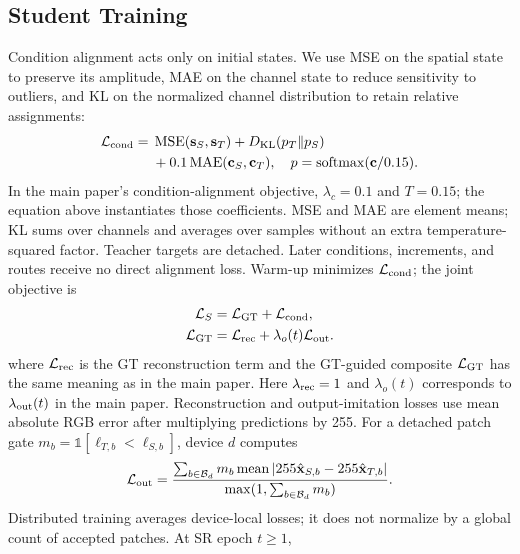 \documentclass[10pt,journal,letterpaper]{IEEEtran}
\begin{document}
\subsection{Student Training}
Condition alignment acts only on initial states. We use MSE on the spatial state to preserve its amplitude, MAE on the channel state to reduce sensitivity to outliers, and KL on the normalized channel distribution to retain relative assignments:
\begin{equation}
\begin{split}
\mathcal L_{\rm cond}={}&\operatorname{MSE}(\mathbf s_S,\mathbf s_T)
+D_{\rm KL}(p_T\Vert p_S)\\
&+0.1\operatorname{MAE}(\mathbf c_S,\mathbf c_T),\quad
p=\operatorname{softmax}(\mathbf c/0.15).
\end{split}
\label{eq:supp_student_cond}
\end{equation}
In the main paper's condition-alignment objective, $\lambda_c=0.1$ and $T=0.15$; the equation above instantiates those coefficients. MSE and MAE are element means; KL sums over channels and averages over samples without an extra temperature-squared factor. Teacher targets are detached. Later conditions, increments, and routes receive no direct alignment loss. Warm-up minimizes $\mathcal L_{\rm cond}$; the joint objective is
\begin{equation}
\begin{aligned}
\mathcal L_S&=\mathcal L_{\rm GT}+\mathcal L_{\rm cond},\\
\mathcal L_{\rm GT}&=\mathcal L_{\rm rec}+\lambda_o(t)\mathcal L_{\rm out}.
\end{aligned}
\label{eq:supp_student}
\end{equation}
where $\mathcal L_{\rm rec}$ is the GT reconstruction term and the GT-guided composite $\mathcal L_{\rm GT}$ has the same meaning as in the main paper. Here $\lambda_{\rm rec}=1$ and $\lambda_o(t)$ corresponds to $\lambda_{\rm out}(t)$ in the main paper. Reconstruction and output-imitation losses use mean absolute RGB error after multiplying predictions by 255. For a detached patch gate $m_b=\mathbb1[\ell_{T,b}<\ell_{S,b}]$, device $d$ computes
\begin{equation}
\mathcal L_{\rm out}=
\frac{\sum_{b\in\mathcal B_d}m_b\operatorname{mean}|255\hat{\mathbf x}_{S,b}-255\hat{\mathbf x}_{T,b}|}
{\max(1,\sum_{b\in\mathcal B_d}m_b)}.
\label{eq:supp_output}
\end{equation}
Distributed training averages device-local losses; it does not normalize by a global count of accepted patches. At SR epoch $t\ge1$,
\end{document}
